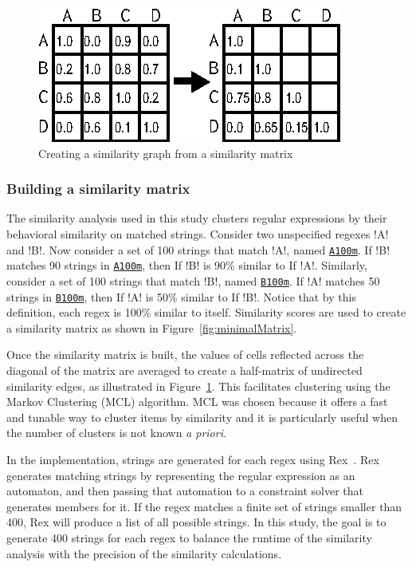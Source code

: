 \begin{figure}[tb]
\centering
\includegraphics[width=0.5\columnwidth]{nontex/illustrations/matrixToGraph.eps}
\vspace{-6pt}
\caption{Creating a similarity graph from a similarity matrix}
\vspace{-6pt}
\label{fig:matrixToGraph}
\end{figure}



\subsubsection{Building a similarity matrix}
\label{sec:buildingSimilarity}
The similarity analysis used in this study clusters regular expressions by their behavioral similarity on matched strings.  Consider two unspecified regexes \cverb!A! and \cverb!B!.
Now consider a set of 100 strings that match \cverb!A!, named \underline{\tt A100m}.  If \cverb!B! matches 90 strings in \underline{\tt A100m}, then If \cverb!B! is 90\% similar to If \cverb!A!.  Similarly, consider a set of 100 strings that match \cverb!B!, named \underline{\tt B100m}.  If \cverb!A! matches 50 strings in \underline{\tt B100m}, then If \cverb!A! is 50\% similar to If \cverb!B!.  Notice that by this definition, each regex is 100\% similar to itself.  Similarity scores are used to create a similarity matrix as shown in Figure~\ref{fig:minimalMatrix}.

Once the similarity matrix is built, the values of cells reflected across the diagonal of the matrix are averaged to create a half-matrix of undirected similarity edges, as illustrated in Figure~\ref{fig:matrixToGraph}.
This facilitates clustering using the  Markov Clustering (MCL) algorithm.
MCL was chosen because it offers a fast and tunable way to cluster items by similarity and it is particularly useful when the number of clusters is not known \emph{a priori}.


In the implementation, strings are generated for each regex using Rex~.  Rex generates matching strings by representing the regular expression as an automaton, and then passing that automation to a constraint solver that generates members for it.  If the regex matches a finite set of strings smaller than 400, Rex will produce a list of all possible strings.
In this study, the goal is to generate 400 strings for each regex to balance the runtime of the similarity analysis with the precision of the similarity calculations.


